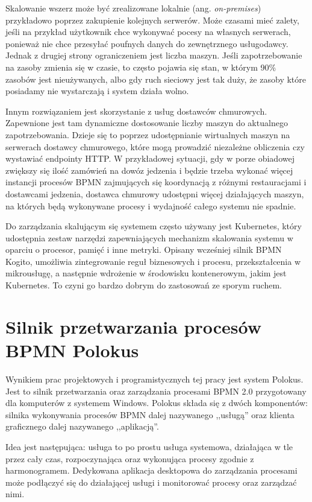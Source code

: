 \documentclass[declaration,shortabstract,mgr]{iithesis}
\newcommand{\bpmn}{BPMN }
\begin{document}
Skalowanie wszerz może być zrealizowane lokalnie (ang. \textit{on-premises}) przykładowo poprzez zakupienie kolejnych serwerów. Może czasami mieć zalety, jeśli na przykład użytkownik chce wykonywać pocesy na własnych serwerach, ponieważ nie chce przesyłać poufnych danych do zewnętrznego usługodawcy. Jednak z drugiej strony ograniczeniem jest liczba maszyn. Jeśli zapotrzebowanie na zasoby zmienia się w czasie, to często pojawia się stan, w którym 90\% zasobów jest nieużywanych, albo gdy ruch sieciowy jest tak duży, że zasoby które posiadamy nie wystarczają i system działa wolno.

Innym rozwiązaniem jest skorzystanie z usług dostawców chmurowych. Zapewnione jest tam dynamiczne dostosowanie liczby maszyn do aktualnego zapotrzebowania. Dzieje się to poprzez udostępnianie wirtualnych maszyn na serwerach dostawcy chmurowego, które mogą prowadzić niezależne obliczenia czy wystawiać endpointy HTTP. W przykładowej sytuacji, gdy w porze obiadowej zwiększy się ilość zamówień na dowóz jedzenia i będzie trzeba wykonać więcej instancji procesów \bpmn zajmujących się koordynacją z różnymi restauracjami i dostawcami jedzenia, dostawca chmurowy udostępni więcej działających maszyn, na których będą wykonywane procesy i wydajność całego systemu nie spadnie.

Do zarządzania skalującym się systemem często używany jest Kubernetes, który udostępnia zestaw narzędzi zapewniających mechanizm skalowania systemu w oparciu o procesor, pamięć i inne metryki. Opisany wcześniej silnik \bpmn Kogito, umożliwia zintegrowanie reguł biznesowych i procesu, przekształcenia w mikrousługę, a następnie wdrożenie w środowisku kontenerowym, jakim jest Kubernetes. To czyni go bardzo dobrym do zastosowań ze sporym ruchem.


\chapter{Silnik przetwarzania procesów BPMN Polokus}\label{chapter-polokus}

Wynikiem prac projektowych i programistycznych tej pracy jest system Polokus. Jest to silnik przetwarzania oraz zarządzania procesami \bpmn 2.0 przygotowany dla komputerów z systemem Windows. Polokus składa się z dwóch komponentów: silnika wykonywania procesów \bpmn dalej nazywanego ,,usługą'' oraz klienta graficznego dalej nazywanego ,,aplikacją''. 

Idea jest następująca: usługa to po prostu usługa systemowa, działająca w tle przez cały czas, rozpoczynająca oraz wykonująca procesy zgodnie z harmonogramem. Dedykowana aplikacja desktopowa do zarządzania procesami może podłączyć się do działającej usługi i monitorować procesy oraz zarządzać nimi. 
\end{document}
